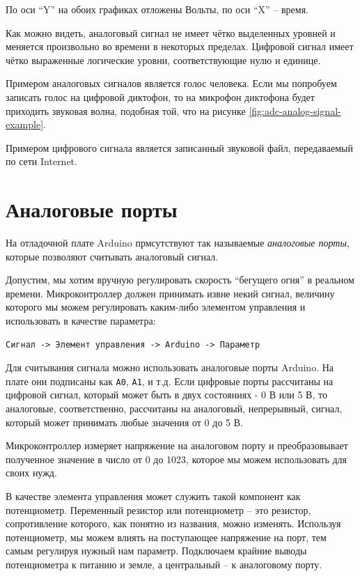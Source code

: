 \documentclass[a4paper,twoside]{book}
\begin{document}
По оси ``Y'' на обоих графиках отложены Вольты, по оси ``X'' -- время.

Как можно видеть, аналоговый сигнал не имеет чётко выделенных уровней и меняется
произвольно во времени в некоторых пределах.  Цифровой сигнал имеет чётко
выраженные логические уровни, соответствующие нулю и единице.

Примером аналоговых сигналов является голос человека.  Если мы попробуем
записать голос на цифровой диктофон, то на микрофон диктофона будет приходить
звуковая волна, подобная той, что на рисунке
\ref{fig:adc-analog-signal-example}.

Примером цифрового сигнала является записанный звуковой файл, передаваемый по
сети Internet.

\section{Аналоговые порты}

На отладочной плате Arduino прмсутствуют так называемые \emph{аналоговые порты},
которые позволяют считывать аналоговый сигнал.

Допустим, мы хотим вручную регулировать скорость ``бегущего огня'' в реальном
времени. Микроконтроллер должен принимать извне некий сигнал, величину которого
мы можем регулировать каким-либо элементом управления и использовать в качестве
параметра:

\begin{verbatim}
Сигнал -> Элемент управления -> Arduino -> Параметр
\end{verbatim}

Для считывания сигнала можно использовать аналоговые порты Arduino. На плате они
подписаны как \texttt{A0}, \texttt{A1}, и т.д. Если цифровые порты рассчитаны на
цифровой сигнал, который может быть в двух состояниях - 0 В или 5 В, то
аналоговые, соответственно, рассчитаны на аналоговый, непрерывный, сигнал,
который может принимать любые значения от 0 до 5 В.

Микроконтроллер измеряет напряжение на аналоговом порту и преобразовывает
полученное значение в число от 0 до 1023, которое мы можем использовать для
своих нужд.

В качестве элемента управления может служить такой компонент как потенциометр.
Переменный резистор или потенциометр -- это резистор, сопротивление которого,
как понятно из названия, можно изменять. Используя потенциометр, мы можем влиять
на поступающее напряжение на порт, тем самым регулируя нужный нам параметр.
Подключаем крайние выводы потенциометра к питанию и земле, а центральный -- к
аналоговому порту.
\end{document}

